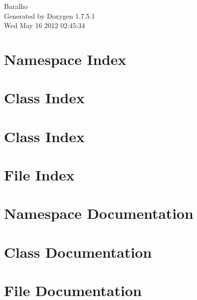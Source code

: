 \documentclass[a4paper]{book}
\begin{document}
\hypersetup{pageanchor=false,citecolor=blue}
\begin{titlepage}
\vspace*{7cm}
\begin{center}
{\Large \-Baralho }\\
\vspace*{1cm}
{\large \-Generated by Doxygen 1.7.5.1}\\
\vspace*{0.5cm}
{\small Wed May 16 2012 02:45:34}\\
\end{center}
\end{titlepage}
\clearemptydoublepage
{}
\tableofcontents
\clearemptydoublepage
{}
\hypersetup{pageanchor=true,citecolor=blue}
\chapter{\-Namespace \-Index}

\chapter{\-Class \-Index}

\chapter{\-Class \-Index}

\chapter{\-File \-Index}

\chapter{\-Namespace \-Documentation}


\chapter{\-Class \-Documentation}









\chapter{\-File \-Documentation}










\printindex
\end{document}
